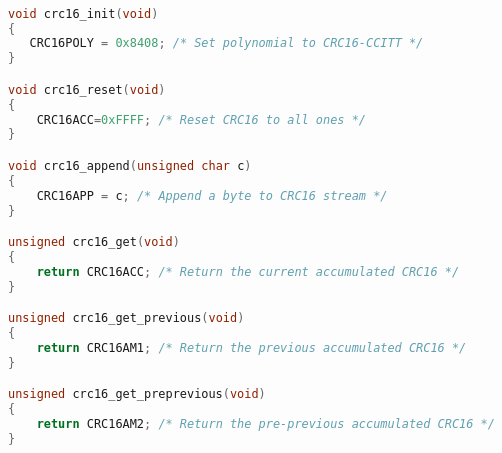 \begin{lstlisting}[language=C++]

void crc16_init(void)
{
   CRC16POLY = 0x8408; /* Set polynomial to CRC16-CCITT */
}

void crc16_reset(void)
{
    CRC16ACC=0xFFFF; /* Reset CRC16 to all ones */
}

void crc16_append(unsigned char c)
{
    CRC16APP = c; /* Append a byte to CRC16 stream */
}

unsigned crc16_get(void)
{
    return CRC16ACC; /* Return the current accumulated CRC16 */
}

unsigned crc16_get_previous(void)
{                    
    return CRC16AM1; /* Return the previous accumulated CRC16 */
}

unsigned crc16_get_preprevious(void)
{
    return CRC16AM2; /* Return the pre-previous accumulated CRC16 */
}

\end{lstlisting}        
        